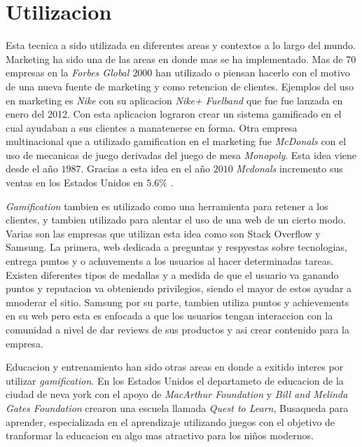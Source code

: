 \section{Utilizacion}

Esta tecnica a sido utilizada en diferentes areas y contextos a lo largo del mundo. Marketing ha sido una 
de las areas en donde mas se ha implementado. Mas de 70 empresas en la \emph{Forbes Global $2000$} han
utilizado o piensan hacerlo con el motivo de una nueva fuente de marketing y como retencion de 
clientes\cite{Gam:Util:1}. Ejemplos del uso en marketing es \emph{Nike} con su aplicacion \emph{Nike+ Fuelband} que
fue fue lanzada en enero del 2012\cite{Gam:Util:2}. Con esta aplicacion lograron crear un sistema 
gamificado en el cual ayudaban a sus clientes a manatenerse en forma. Otra empresa multinacional que a utilizado
gamification en el marketing fue \emph{McDonals} con el uso de mecanicas de juego derivadas del juego de mesa 
\emph{Monopoly}. Esta idea viene desde el año $1987$. Gracias a esta idea en el año $2010$ \emph{Mcdonals} 
incremento sus ventas en los Estados Unidos en $5.6\%$ \cite{Gam:Util:2}.


\emph{Gamification} tambien es utilizado como una herramienta para retener a los clientes, y tambien utilizado 
para alentar el uso de una web de un cierto modo. Varias son las empresas que utilizan esta idea como son 
Stack Overflow y Samsung. La primera, web dedicada a preguntas y respyestas sobre tecnologias, entrega puntos y o 
achuvements a los usuarios al hacer determinadas tareas. Existen diferentes tipos de medallas y a medida de que el usuario va ganando puntos y reputacion va obteniendo privilegios, siendo el mayor de estos ayudar a mnoderar el sitio.
Samsung por su parte, tambien utiliza puntos y achievements en su web pero esta es enfocada a que los usuarios 
tengan interaccion con la comunidad a nivel de dar reviews de sus productos y asi crear contenido para la
empresa\cite{Gam:Util:3}.

Educacion y entrenamiento han sido otras areas en donde a exitido interes por utilizar \emph{gamification}. En los
 Estados Unidos el departameto de educacion de la ciudad de neva york con el apoyo de \emph{MacArthur Foundation} y
\emph{Bill and Melinda Gates Foundation} crearon una escuela llamada \emph{Quest to Learn}, Busaqueda para aprender,
especializada en el aprendizaje utilizando juegos con el objetivo de tranformar la educacion en algo mas atractivo
para los niños modernos\cite{Gam:Util:4}.

